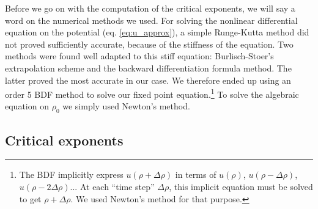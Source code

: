 Before we go on with the computation of the critical exponents, we will say a word on the numerical methods we used. For solving the nonlinear differential equation on the potential (eq. \eqref{eq:u_approx}), a simple Runge-Kutta method did not proved sufficiently accurate, because of the stiffness of the equation. Two methods were found well adapted to this stiff equation: Burlisch-Stoer's extrapolation scheme and the backward differentiation formula method. The latter proved the most accurate in our case. We therefore ended up using an order 5 BDF method to solve our fixed point equation.\footnote{The BDF implicitly express $u(\rho + \Delta \rho)$ in terms of $u(\rho)$, $u(\rho - \Delta \rho)$, $u(\rho - 2 \Delta \rho)$... At each ``time step'' $\Delta \rho$, this implicit equation must be solved to get $\rho + \Delta \rho$. We used Newton's method for that purpose.} 
To solve the algebraic equation on $\rho_0$ we simply used Newton's method.

\subsection{Critical exponents}

